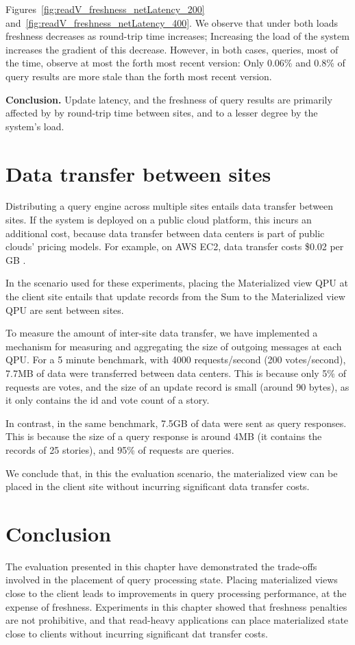 Figures~\ref{fig:readV_freshness_netLatency_200} and~\ref{fig:readV_freshness_netLatency_400}.
We observe that under both loads freshness decreases as round-trip time increases;
Increasing the load of the system increases the gradient of this decrease.
However, in both cases, queries, most of the time, observe at most the forth most recent version:
Only 0.06\% and 0.8\% of query results are more stale than the forth most recent version.

\medskip
\noindent
\textbf{Conclusion.}
Update latency, and the freshness of query results are primarily affected by
by round-trip time between sites,
and to a lesser degree by the system's load.

\section{Data transfer between sites}
\label{sec:eval_data_transfer}
Distributing a query engine across multiple sites entails data transfer between sites.
If the system is deployed on a public cloud platform, this incurs an additional cost,
because data transfer between data centers is part of public clouds' pricing models.
For example, on AWS EC2, data transfer costs \$0.02 per GB \cite{aws:pricing}.

In the scenario used for these experiments, placing the Materialized view QPU at the client site entails that
update records from the Sum to the Materialized view QPU are sent between sites.

To measure the amount of inter-site data transfer,
we have implemented a mechanism for measuring and aggregating the size of outgoing messages at each QPU.
For a 5 minute benchmark, with 4000 requests/second (200 votes/second), 7.7MB of data were transferred between data centers.
This is because only 5\% of requests are votes, and the size of an update record is small (around 90 bytes),
as it only contains the id and vote count of a story.

In contrast, in the same benchmark, 7.5GB of data were sent as query responses.
This is because the size of a query response is around 4MB
(it contains the records of 25 stories), and 95\% of requests are queries.

We conclude that, in this the evaluation scenario, the materialized view can be placed in the client site without incurring
significant data transfer costs.

\section{Conclusion}
The evaluation presented in this chapter have demonstrated the trade-offs involved in the placement of query processing state.
Placing materialized views close to the client leads to improvements in query processing performance,
at the expense of freshness.
Experiments in this chapter showed that freshness penalties are not prohibitive,
and that read-heavy applications can place materialized state close to clients without incurring significant
dat transfer costs.

